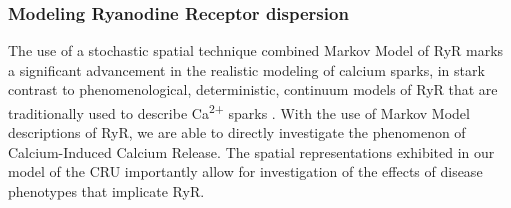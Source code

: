 \documentclass[12pt]{ucsddissertation}
\begin{document}
\subsubsection{Modeling Ryanodine Receptor dispersion}
The use of a stochastic spatial technique combined Markov Model of RyR marks a significant advancement in the realistic modeling of calcium sparks, in stark contrast to phenomenological, deterministic, continuum models of RyR that are traditionally used to describe Ca\textsuperscript{2+} sparks \cite{Maleckar2017}. With the use of Markov Model descriptions of RyR, we are able to directly investigate the phenomenon of Calcium-Induced Calcium Release. The spatial representations exhibited in our model of the CRU importantly allow for investigation of the effects of disease phenotypes that implicate RyR.

\setcounter{figure}{14}
\end{document}
